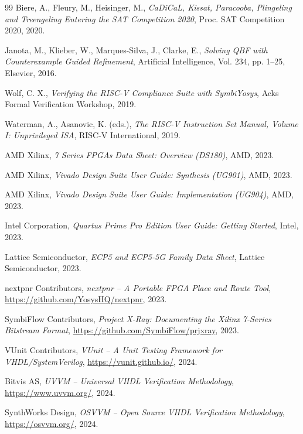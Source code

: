 ﻿\documentclass[12pt,a4paper]{report}
\begin{document}
\begin{thebibliography}{99}
  Biere, A., Fleury, M., Heisinger, M.,
  \textit{CaDiCaL, Kissat, Paracooba, Plingeling and Treengeling Entering the SAT
  Competition 2020},
  Proc. SAT Competition 2020, 2020.

  Janota, M., Klieber, W., Marques-Silva, J., Clarke, E.,
  \textit{Solving QBF with Counterexample Guided Refinement},
  Artificial Intelligence, Vol. 234, pp. 1--25, Elsevier, 2016.

  Wolf, C. X.,
  \textit{Verifying the RISC-V Compliance Suite with SymbiYosys},
  Acks Formal Verification Workshop, 2019.

  Waterman, A., Asanovic, K. (eds.),
  \textit{The RISC-V Instruction Set Manual, Volume I: Unprivileged ISA},
  RISC-V International, 2019.

  AMD Xilinx,
  \textit{7 Series FPGAs Data Sheet: Overview (DS180)},
  AMD, 2023.

  AMD Xilinx,
  \textit{Vivado Design Suite User Guide: Synthesis (UG901)},
  AMD, 2023.

  AMD Xilinx,
  \textit{Vivado Design Suite User Guide: Implementation (UG904)},
  AMD, 2023.

  Intel Corporation,
  \textit{Quartus Prime Pro Edition User Guide: Getting Started},
  Intel, 2023.

  Lattice Semiconductor,
  \textit{ECP5 and ECP5-5G Family Data Sheet},
  Lattice Semiconductor, 2023.

  nextpnr Contributors,
  \textit{nextpnr -- A Portable FPGA Place and Route Tool},
  \url{https://github.com/YosysHQ/nextpnr},
  2023.

  SymbiFlow Contributors,
  \textit{Project X-Ray: Documenting the Xilinx 7-Series Bitstream Format},
  \url{https://github.com/SymbiFlow/prjxray},
  2023.

  VUnit Contributors,
  \textit{VUnit -- A Unit Testing Framework for VHDL/SystemVerilog},
  \url{https://vunit.github.io/},
  2024.

  Bitvis AS,
  \textit{UVVM -- Universal VHDL Verification Methodology},
  \url{https://www.uvvm.org/},
  2024.

  SynthWorks Design,
  \textit{OSVVM -- Open Source VHDL Verification Methodology},
  \url{https://osvvm.org/},
  2024.


\end{thebibliography}
\end{document}
